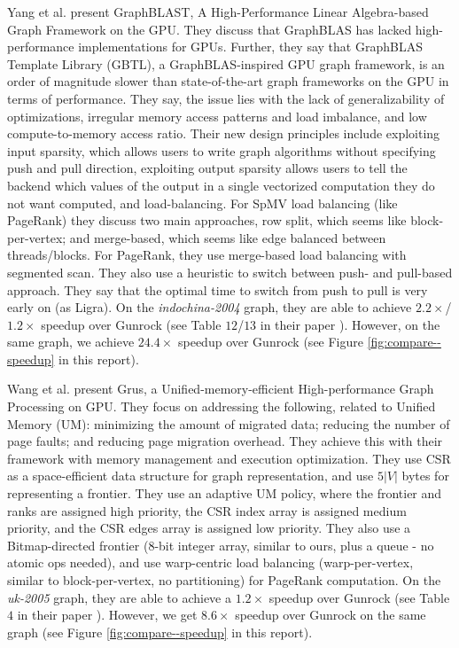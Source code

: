 Yang et al. \cite{yang2022graphblast} present GraphBLAST, A High-Performance Linear Algebra-based Graph Framework on the GPU. They discuss that GraphBLAS has lacked high-performance implementations for GPUs. Further, they say that GraphBLAS Template Library (GBTL), a GraphBLAS-inspired GPU graph framework, is an order of magnitude slower than state-of-the-art graph frameworks on the GPU in terms of performance. They say, the issue lies with the lack of generalizability of optimizations, irregular memory access patterns and load imbalance, and low compute-to-memory access ratio. Their new design principles include exploiting input sparsity, which allows users to write graph algorithms without specifying push and pull direction, exploiting output sparsity allows users to tell the backend which values of the output in a single vectorized computation they do not want computed, and load-balancing. For SpMV load balancing (like PageRank) they discuss two main approaches, row split, which seems like block-per-vertex; and merge-based, which seems like edge balanced between threads/blocks. For PageRank, they use merge-based load balancing with segmented scan. They also use a heuristic to switch between push- and pull-based approach. They say that the optimal time to switch from push to pull is very early on (as Ligra). On the \textit{indochina-2004} graph, they are able to achieve $2.2\times$/$1.2\times$ speedup over Gunrock (see Table $12$/$13$ in their paper \cite{yang2022graphblast}). However, on the same graph, we achieve $24.4\times$ speedup over Gunrock (see Figure \ref{fig:compare--speedup} in this report).

Wang et al. \cite{wang2021grus} present Grus, a Unified-memory-efficient High-performance Graph Processing on GPU. They focus on addressing the following, related to Unified Memory (UM): minimizing the amount of migrated data; reducing the number of page faults; and reducing page migration overhead. They achieve this with their framework with memory management and execution optimization. They use CSR as a space-efficient data structure for graph representation, and use $5|V|$ bytes for representing a frontier. They use an adaptive UM policy, where the frontier and ranks are assigned high priority, the CSR index array is assigned medium priority, and the CSR edges array is assigned low priority. They also use a Bitmap-directed frontier (8-bit integer array, similar to ours, plus a queue - no atomic ops needed), and use warp-centric load balancing (warp-per-vertex, similar to block-per-vertex, no partitioning) for PageRank computation. On the \textit{uk-2005} graph, they are able to achieve a $1.2\times$ speedup over Gunrock (see Table $4$ in their paper \cite{wang2021grus}). However, we get $8.6\times$ speedup over Gunrock on the same graph (see Figure \ref{fig:compare--speedup} in this report).

